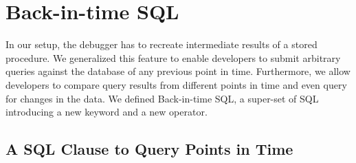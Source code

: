 \documentclass[english,conference,final]{IEEEtran}
\newcommand{\SQLextension}{Back-in-time SQL}
\begin{document}
\newcommand{\red}[1]{\textcolor{DarkRed}{#1}}
\newcommand{\gr}[1]{\textcolor{Green}{#1}}
%
\newcommand{\timediffresult}{
\ctable[caption={Result of a time-diff query, with multiple values in some columns. Red indicates a different value at the \emph{before} step, green a different value at the \emph{after} step.},label=tab:diffresult,doinside={\small}]
				{rrrrrrr}{}{
	\multicolumn{3}{c}{pr.} & \multicolumn{1}{c}{po.} & \multicolumn{3}{c}{po2.} \NN
	\cmidrule(lr){1-3} \cmidrule(lr){4-4} \cmidrule(lr){5-7}
	id & name & budget  & total & id & status & total \ML
	
				&						& \red{1200} & \red{1500} &	  & \red{open} &					\NN
	1			&	Project 1	& 200			 	 & 500 			  & 1 & paid 			 & 1000			\NN
				&						& \gr{-300}  & \gr{0}		  &	  &						 &					\ML

				&						& \red{1200} & \red{1500} &	  & 					 &					\NN
	1			&	Project 1	& 200				 & 500 			  & 2 & open 			 & 500			\NN
				&						& \gr{-300}  & \gr{0}		  &	  & \gr{paid}	 &					\ML
}
}

\section{\SQLextension}
\label{sec:ttqueries}

In our setup, the debugger has to recreate intermediate results of a stored procedure.
We generalized this feature to enable developers to submit arbitrary queries against the database of any previous point in time.
Furthermore, we allow developers to compare query results from different points in time and even query for changes in the data.
We defined \SQLextension, a super-set of SQL introducing a new keyword and a new operator.

\subsection{A SQL Clause to Query Points in Time}
\end{document}
